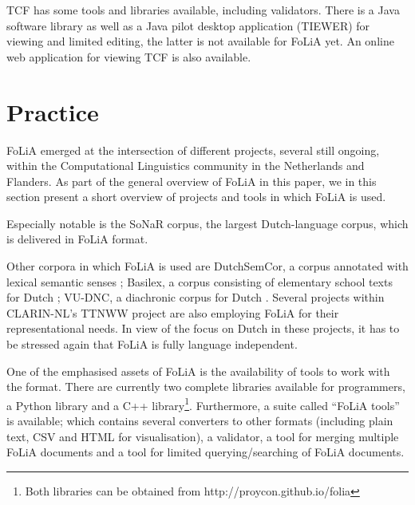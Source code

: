 \documentclass[a4paper,10pt,twoside]{article}
\begin{document}
TCF has some tools and libraries available, including validators. There is a
Java software library as well as a Java pilot desktop application (TIEWER) for
viewing and limited editing, the latter is not available for FoLiA yet. An
online web application for viewing TCF is also available.








\section{Practice}
\label{sec:practice}

FoLiA emerged at the intersection of different projects, several still ongoing, within the Computational
Linguistics community in the Netherlands and Flanders. As part of the general overview of FoLiA in this paper, we in
this section present a short overview of projects and tools in which FoLiA is
used.
 
Especially notable is the SoNaR corpus, the largest Dutch-language corpus,
which is delivered in FoLiA format. 

Other corpora in which FoLiA is used are DutchSemCor, a corpus annotated with
lexical semantic senses \cite{DUTCHSEMCOR}; Basilex, a corpus consisting of elementary school
texts for Dutch \cite{BASILEX}; VU-DNC, a diachronic corpus for Dutch
\cite{VUDNC}. Several projects within CLARIN-NL's TTNWW project are also
employing FoLiA for their representational needs. In view of the focus on Dutch
in these projects, it has to be stressed again that FoLiA is fully language independent.

One of the emphasised assets of FoLiA is the availability of tools to work with the
format. There are currently two complete libraries available for programmers, a Python
library and a C++ library\footnote{Both libraries can be obtained from
http://proycon.github.io/folia}. Furthermore, a suite called ``FoLiA tools'' is
available; which contains several converters to other formats (including plain
text, CSV and HTML for visualisation), a validator, a tool for merging
multiple FoLiA documents and a tool for limited querying/searching of FoLiA documents.
\end{document}
